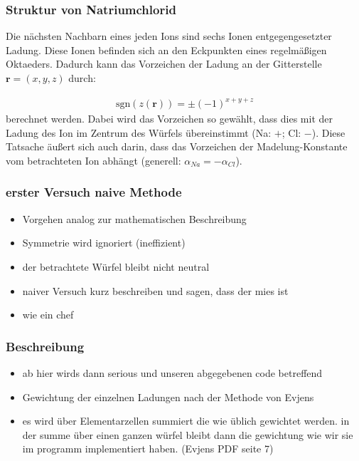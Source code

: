 \documentclass[10pt,a4paper]{article}
\begin{document}
\subsubsection{Struktur von Natriumchlorid}

Die nächsten Nachbarn eines jeden Ions sind sechs Ionen entgegengesetzter Ladung. Diese Ionen befinden sich an den Eckpunkten eines regelmäßigen Oktaeders. Dadurch kann das Vorzeichen der Ladung an der Gitterstelle $\mathbf{r} = \left( x,y,z \right)$ durch:

\begin{align}
\mathrm{sgn}\left(z(\mathbf{r})\right) = \pm \left( -1 \right)^{x+y+z}
\end{align}
berechnet werden. Dabei wird das Vorzeichen so gewählt, dass dies mit der Ladung des Ion im Zentrum des Würfels übereinstimmt (Na: $+$; Cl: $-$). Diese Tatsache äußert sich auch darin, dass das Vorzeichen der Madelung-Konstante vom betrachteten Ion abhängt (generell: $\alpha_{Na} = - \alpha_{Cl}$).
\subsubsection{erster Versuch naive Methode}

\begin{itemize}
\item Vorgehen analog zur mathematischen Beschreibung
\item Symmetrie wird ignoriert (ineffizient)
\item der betrachtete Würfel bleibt nicht neutral
\item naiver Versuch kurz beschreiben und sagen, dass der mies ist
\item wie ein chef
\end{itemize}

\subsubsection{Beschreibung}

\begin{itemize}
\item ab hier wirds dann serious und unseren abgegebenen code betreffend
\item Gewichtung der einzelnen Ladungen nach der Methode von Evjens\cite{Evjen}
\item es wird über Elementarzellen summiert die wie üblich gewichtet werden. in der summe über einen ganzen würfel bleibt dann die gewichtung wie wir sie im programm implementiert haben. (Evjens PDF seite 7)
\end{itemize}
\end{document}

